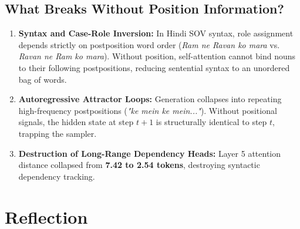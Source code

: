\documentclass[10pt,a4paper]{article}
\begin{document}
\subsection{What Breaks Without Position Information?}
\begin{enumerate}[noitemsep,leftmargin=*]
    \item \textbf{Syntax and Case-Role Inversion:} In Hindi SOV syntax, role assignment depends strictly on postposition word order (\textit{Ram ne Ravan ko mara} vs. \textit{Ravan ne Ram ko mara}). Without position, self-attention cannot bind nouns to their following postpositions, reducing sentential syntax to an unordered bag of words.
    \item \textbf{Autoregressive Attractor Loops:} Generation collapses into repeating high-frequency postpositions (\textit{"ke mein ke mein..."}). Without positional signals, the hidden state at step $t+1$ is structurally identical to step $t$, trapping the sampler.
    \item \textbf{Destruction of Long-Range Dependency Heads:} Layer 5 attention distance collapsed from \textbf{7.42 to 2.54 tokens}, destroying syntactic dependency tracking.
\end{enumerate}

\section{Reflection}
\end{document}
